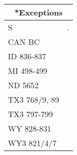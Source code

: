\documentclass{article}
\begin{document}
\fontsize{30}{36}\selectfont
\begin{minipage}{0.5\textwidth}
\centering
\fontsize{40}{48}\selectfont
\begin{tabular}[t]{ll}
\multicolumn{2}{c}{\textbf{*Exceptions}} \\
\toprule
S                 & .    \\ \midrule
CAN BC          & \cellcolor{blue}   \\
ID 836-837      & \cellcolor{red}    \\
MI 498-499      & \cellcolor{red}    \\
ND 5652         & \cellcolor{yellow} \\
TX3 768/9, 89 & \cellcolor{red}    \\
TX3 797-799   & \cellcolor{red}    \\
WY 828-831      & \cellcolor{red}    \\
WY3 821/4/7   & \cellcolor{blue}  \\ \bottomrule
\end{tabular}
\end{minipage}
\end{document}

